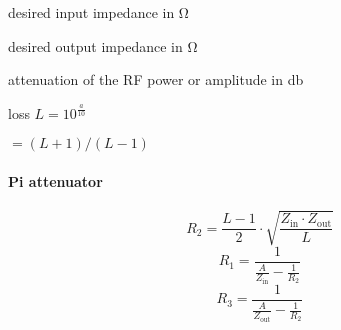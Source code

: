 \documentclass[varwidth,convert={density=300,size=800x800,outext=.png}]{standalone}
\newcommand{\Zin}{Z_\mathrm{in}}
\newcommand{\Zout}{Z_\mathrm{out}}
\begin{document}
\begin{description}[labelindent=0pt,labelsep=10pt]
\item[$\Zin$] desired input impedance in \si{\ohm}
\item[$\Zout$] desired output impedance in \si{\ohm}
\item[$a$] attenuation of the RF power or amplitude in \si{\decibel}
\item[$L$] loss $L = 10^{\frac{a}{10}}$ 
\item[$A$] $= (L+1)/(L-1)$
\end{description}

\paragraph{Pi attenuator}
\[R_2 = \frac{L - 1}{2} \cdot \sqrt{\frac{\Zin \cdot \Zout}{L}} \]
\[R_1 = \frac{1}{ \frac{A}{\Zin} -  \frac{1}{R_2}}\]
\[R_3 = \frac{1}{ \frac{A}{\Zout} -  \frac{1}{R_2}}\]

\end{document}

